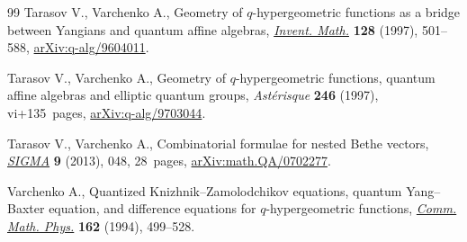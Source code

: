 \documentclass[pdftex]{sigma}
\numberwithin{equation}{section}
\begin{document}
\begin{thebibliography}{99}
Tarasov V., Varchenko A., Geometry of {$q$}-hypergeometric functions as a
 bridge between {Y}angians and quantum affine algebras, \href{https://doi.org/10.1007/s002220050151}{\textit{Invent. Math.}}
 \textbf{128} (1997), 501--588, \href{https://arxiv.org/abs/q-alg/9604011}{arXiv:q-alg/9604011}.

Tarasov V., Varchenko A., Geometry of {$q$}-hypergeometric functions, quantum
 affine algebras and elliptic quantum groups, \textit{Ast\'{e}risque}
 \textbf{246} (1997), vi+135~pages, \href{https://arxiv.org/abs/q-alg/9703044}{arXiv:q-alg/9703044}.

Tarasov V., Varchenko A., Combinatorial formulae for nested {B}ethe vectors,
 \href{https://doi.org/10.3842/SIGMA.2013.048}{\textit{SIGMA}} \textbf{9} (2013), 048, 28~pages, \href{https://arxiv.org/abs/math.QA/0702277}{arXiv:math.QA/0702277}.

Varchenko A., Quantized {K}nizhnik--{Z}amolodchikov equations, quantum
 {Y}ang--{B}axter equation, and dif\-fe\-rence equations for {$q$}-hypergeometric
 functions, \href{https://doi.org/10.1007/BF02101745}{\textit{Comm. Math. Phys.}} \textbf{162} (1994), 499--528.

\end{thebibliography}\LastPageEnding
\end{document}
